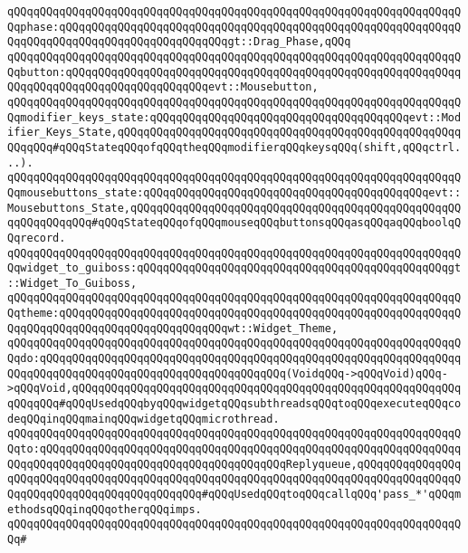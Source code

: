 \verb|qQQqqQQqqQQqqQQqqQQqqQQqqQQqqQQqqQQqqQQqqQQqqQQqqQQqqQQqqQQqqQQqqQQqqQQqphase:qQQqqQQqqQQqqQQqqQQqqQQqqQQqqQQqqQQqqQQqqQQqqQQqqQQqqQQqqQQqqQQqqQQqqQQqqQQqqQQqqQQqqQQqqQQqqQQqgt::Drag_Phase,qQQq|\newline
\verb|qQQqqQQqqQQqqQQqqQQqqQQqqQQqqQQqqQQqqQQqqQQqqQQqqQQqqQQqqQQqqQQqqQQqqQQqbutton:qQQqqQQqqQQqqQQqqQQqqQQqqQQqqQQqqQQqqQQqqQQqqQQqqQQqqQQqqQQqqQQqqQQqqQQqqQQqqQQqqQQqqQQqqQQqevt::Mousebutton,|\newline
\verb|qQQqqQQqqQQqqQQqqQQqqQQqqQQqqQQqqQQqqQQqqQQqqQQqqQQqqQQqqQQqqQQqqQQqqQQqmodifier_keys_state:qQQqqQQqqQQqqQQqqQQqqQQqqQQqqQQqqQQqqQQqevt::Modifier_Keys_State,qQQqqQQqqQQqqQQqqQQqqQQqqQQqqQQqqQQqqQQqqQQqqQQqqQQqqQQqqQQq#qQQqStateqQQqofqQQqtheqQQqmodifierqQQqkeysqQQq(shift,qQQqctrl...).|\newline
\verb|qQQqqQQqqQQqqQQqqQQqqQQqqQQqqQQqqQQqqQQqqQQqqQQqqQQqqQQqqQQqqQQqqQQqqQQqmousebuttons_state:qQQqqQQqqQQqqQQqqQQqqQQqqQQqqQQqqQQqqQQqqQQqevt::Mousebuttons_State,qQQqqQQqqQQqqQQqqQQqqQQqqQQqqQQqqQQqqQQqqQQqqQQqqQQqqQQqqQQqqQQq#qQQqStateqQQqofqQQqmouseqQQqbuttonsqQQqasqQQqaqQQqboolqQQqrecord.|\newline
\verb|qQQqqQQqqQQqqQQqqQQqqQQqqQQqqQQqqQQqqQQqqQQqqQQqqQQqqQQqqQQqqQQqqQQqqQQqwidget_to_guiboss:qQQqqQQqqQQqqQQqqQQqqQQqqQQqqQQqqQQqqQQqqQQqqQQqgt::Widget_To_Guiboss,|\newline
\verb|qQQqqQQqqQQqqQQqqQQqqQQqqQQqqQQqqQQqqQQqqQQqqQQqqQQqqQQqqQQqqQQqqQQqqQQqtheme:qQQqqQQqqQQqqQQqqQQqqQQqqQQqqQQqqQQqqQQqqQQqqQQqqQQqqQQqqQQqqQQqqQQqqQQqqQQqqQQqqQQqqQQqqQQqqQQqwt::Widget_Theme,|\newline
\verb|qQQqqQQqqQQqqQQqqQQqqQQqqQQqqQQqqQQqqQQqqQQqqQQqqQQqqQQqqQQqqQQqqQQqqQQqdo:qQQqqQQqqQQqqQQqqQQqqQQqqQQqqQQqqQQqqQQqqQQqqQQqqQQqqQQqqQQqqQQqqQQqqQQqqQQqqQQqqQQqqQQqqQQqqQQqqQQqqQQqqQQq(VoidqQQq->qQQqVoid)qQQq->qQQqVoid,qQQqqQQqqQQqqQQqqQQqqQQqqQQqqQQqqQQqqQQqqQQqqQQqqQQqqQQqqQQqqQQqqQQq#qQQqUsedqQQqbyqQQqwidgetqQQqsubthreadsqQQqtoqQQqexecuteqQQqcodeqQQqinqQQqmainqQQqwidgetqQQqmicrothread.|\newline
\verb|qQQqqQQqqQQqqQQqqQQqqQQqqQQqqQQqqQQqqQQqqQQqqQQqqQQqqQQqqQQqqQQqqQQqqQQqto:qQQqqQQqqQQqqQQqqQQqqQQqqQQqqQQqqQQqqQQqqQQqqQQqqQQqqQQqqQQqqQQqqQQqqQQqqQQqqQQqqQQqqQQqqQQqqQQqqQQqqQQqqQQqReplyqueue,qQQqqQQqqQQqqQQqqQQqqQQqqQQqqQQqqQQqqQQqqQQqqQQqqQQqqQQqqQQqqQQqqQQqqQQqqQQqqQQqqQQqqQQqqQQqqQQqqQQqqQQqqQQqqQQqqQQq#qQQqUsedqQQqtoqQQqcallqQQq'pass_*'qQQqmethodsqQQqinqQQqotherqQQqimps.|\newline
\verb|qQQqqQQqqQQqqQQqqQQqqQQqqQQqqQQqqQQqqQQqqQQqqQQqqQQqqQQqqQQqqQQqqQQqqQQq#|\newline
